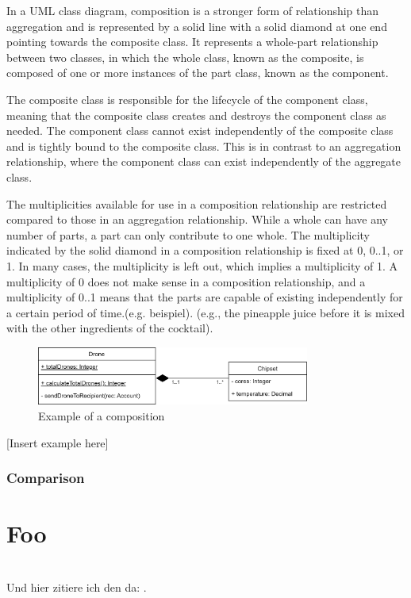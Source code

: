 \documentclass[
	12pt,
    a4paper,
    egregdoesnotlikesansseriftitles, %
    toc=chapterentrywithdots,
    oneside, openany,
    titlepage,
    parskip=half,
    headings=normal,  %
    listof=totoc,
    bibliography=totoc,
    index=totoc,
    captions=tableheading,  %
    listof=flat,
    numbers=noenddot, %
    final]
    {scrbook}
\begin{document}
In a UML class diagram, composition is a stronger form of relationship than aggregation and is represented by a solid line with a solid diamond at one end pointing towards the composite class. It represents a whole-part relationship between two classes, in which the whole class, known as the composite, is composed of one or more instances of the part class, known as the component.

The composite class is responsible for the lifecycle of the component class, meaning that the composite class creates and destroys the component class as needed. The component class cannot exist independently of the composite class and is tightly bound to the composite class. This is in contrast to an aggregation relationship, where the component class can exist independently of the aggregate class.

The multiplicities available for use in a composition relationship are restricted compared to those in an aggregation relationship. While a whole can have any number of parts, a part can only contribute to one whole. The multiplicity indicated by the solid diamond in a composition relationship is fixed at 0, 0..1, or 1. In many cases, the multiplicity is left out, which implies a multiplicity of 1. A multiplicity of 0 does not make sense in a composition relationship, and a multiplicity of 0..1 means that the parts are capable of existing independently for a certain period of time.(e.g. beispiel).
(e.g., the pineapple juice before it is mixed with the other ingredients of the cocktail).
 \cite[p. 153-154]{uml}

\begin{figure}[h]
\centering
\includegraphics[width=0.8\textwidth]{figures/aggr_comp/comp.jpg}
\caption[Example composition]{Example of a composition}
\label{fig:composition_example}
\end{figure}



[Insert example here]


\subsection{Comparison}



\chapter{Foo}
\blindtext
\\Und hier zitiere ich den da: \cite{albrecht_blueprints_2020}.
\end{document}
